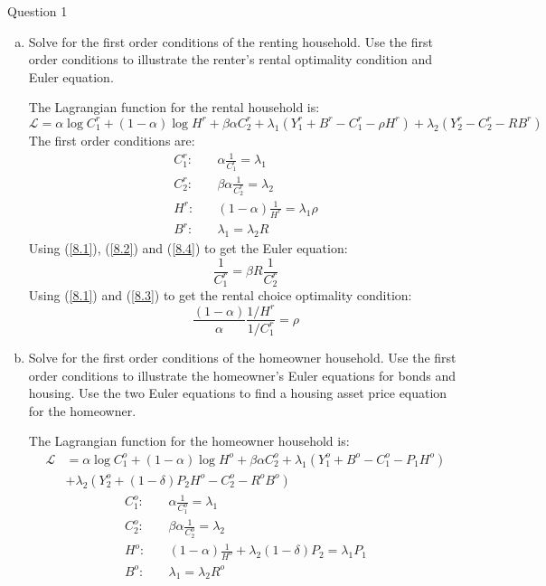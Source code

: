 \documentclass[a4paper]{article}
\newif\IfInSansMode
\begin{document}
\begin{questionbox}{Question 1}
\begin{enumerate}[(a)]
			\item Solve for the ﬁrst order conditions of the renting household. Use the ﬁrst order conditions to illustrate the renter's rental optimality condition and Euler equation.
			\begin{explanationbox}
				The Lagrangian function for the rental household is:
				\[
					\mathcal{L} = \alpha\log C_1^r + (1-\alpha)\log H^r + \beta\alpha C_2^r + \lambda_1(Y_1^r + B^r - C_1^r - \rho H^r) + \lambda_2(Y_2^r - C_2^r - RB^r)
				\]
				The first order conditions are:
				\begin{align}
					C_1^r:\quad &\alpha\frac{1}{C_1^r} = \lambda_1 \label{8.1}\\ 
					C_2^r:\quad &\beta\alpha\frac{1}{C_2^r} = \lambda_2 \label{8.2}\\ 
					H^r:\quad &(1-\alpha)\frac{1}{H^r} = \lambda_1\rho \label{8.3}\\ 
					B^r:\quad &\lambda_1 = \lambda_2 R \label{8.4}
				\end{align}
				Using (\ref{8.1}), (\ref{8.2}) and (\ref{8.4}) to get the Euler equation:
				\[
					\frac{1}{C_1^r} = \beta R \frac{1}{C_2^r}
				\]
				Using (\ref{8.1}) and (\ref{8.3}) to get the rental choice optimality condition:
				\[
					\frac{(1-\alpha)}{\alpha} \frac{1/H^r}{1/C^r_1} = \rho
				\]
			\end{explanationbox}
			\item Solve for the first order conditions of the homeowner household. Use the first order conditions to illustrate the homeowner's Euler equations for bonds and housing. Use the two Euler equations to find a housing asset price equation for the homeowner.
			\begin{explanationbox}
				The Lagrangian function for the homeowner household is:
				\begin{align*}
					\mathcal{L} &= \alpha\log C_1^o + (1-\alpha)\log H^o + \beta\alpha C_2^o + \lambda_1(Y_1^o + B^o - C_1^o - P_1 H^o)\\
					&+ \lambda_2(Y_2^o + (1-\delta)P_2H^o - C_2^o - R^oB^o)
				\end{align*}
				\begin{align}
					C_1^o:\quad &\alpha\frac{1}{C_1^o} = \lambda_1 \label{8.5}\\ 
					C_2^o:\quad &\beta\alpha\frac{1}{C_2^o} = \lambda_2 \label{8.6}\\ 
					H^o:\quad &(1-\alpha)\frac{1}{H^o}+\lambda_2(1-\delta)P_2 = \lambda_1 P_1 \label{8.7}\\ 
					B^o:\quad &\lambda_1 = \lambda_2 R^o \label{8.8}

\end{align}
\end{explanationbox}
\end{enumerate}
\end{questionbox}
\end{document}
